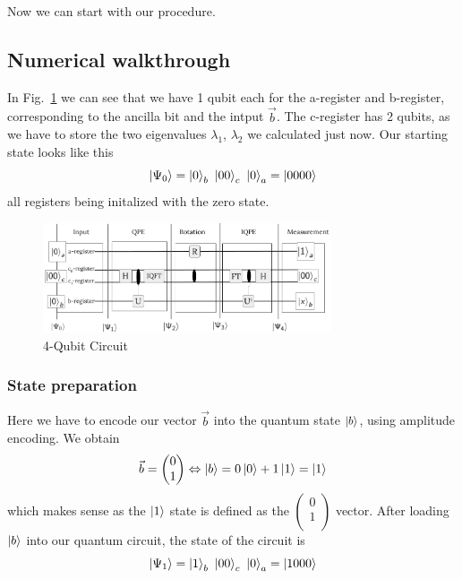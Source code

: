 Now we can start with our procedure.

\subsection{Numerical walkthrough}

In Fig.~\ref{ex_circ_numerical} we can see that we have 1 qubit each for the a-register and b-register, corresponding to the ancilla bit and the intput $\vec b$.
The c-register has 2 qubits, as we have to store the two eigenvalues $\lambda_1$, $\lambda_2$ we calculated just now.
Our starting state looks like this
\begin{equation}
\ket{\Psi_0} = \ket{0}_b\ \ket{00}_c\ \ket{0}_a = \ket{0000}
\end{equation}
all registers being initalized with the zero state.


\begin{figure}
    \centering
    \includegraphics[width=8.5cm]{img/example_circuit_4_qubit_cropped.png}
    \caption{4-Qubit Circuit}
    \label{ex_circ_numerical}
\end{figure}


\subsubsection{State preparation}
    Here we have to encode our vector $\vec{b}$ into the quantum state $\ket{b}$, using amplitude encoding.
    We obtain
    \begin{equation}
    \vec{b} = \begin{pmatrix} 0\\ 1\\ \end{pmatrix}
    \Leftrightarrow \ket{b} = 0 \ket{0} + 1 \ket{1} = \ket{1} 
    \end{equation}
    which makes sense as the $\ket 1$ state is defined as the $\begin{pmatrix} 0\\ 1\\ \end{pmatrix}$ vector.
    After loading $\ket b$ into our quantum circuit, the state of the circuit is 
    \begin{equation}
    \ket{\Psi_1} = \ket{1}_b\ \ket{00}_c\ \ket{0}_a = \ket{1000}
    \end{equation}

